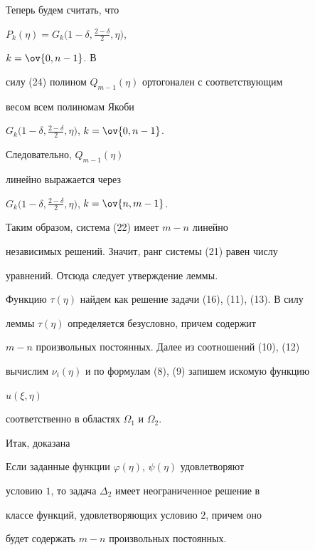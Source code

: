 Теперь будем считать, что 


$P_k(\eta)=G_k\big(1-\delta, \frac{2-\delta}{2},\eta\big)$, 


$k=\ov{0,n-1}$. В 


силу (24) полином $Q_{m-1}(\eta)$ ортогонален с соответствующим 


весом всем полиномам Якоби 


$G_k\big(1-\delta, \frac{2-\delta}{2},\eta\big)$, $k=\ov{0,n-1}$. 


Следовательно, $Q_{m-1}(\eta)$ 


линейно выражается через 


$G_k\big(1-\delta, \frac{2-\delta}{2},\eta\big)$, $k=\ov{n,m-1}$. 


Таким образом, система (22) имеет $m-n$ линейно 


независимых решений. Значит, ранг системы (21) равен числу 


уравнений. Отсюда следует утверждение леммы. 


\medskip 


 


Функцию $\tau(\eta)$ найдем как решение задачи (16), (11), (13). В силу 


леммы $\tau(\eta)$ определяется безусловно, причем содержит 


$m-n$ произвольных постоянных. Далее из соотношений (10), (12) 


вычислим $\nu_i(\eta)$ и по формулам (8), (9) запишем искомую функцию 


$u(\xi,\eta)$ 


соответственно в областях $\Omega_1$ и $\Omega_2$. 


 


Итак, доказана 


 


\begin{thmnonum} 


Если заданные функции $\varphi(\eta)$, $\psi(\eta)$ удовлетворяют 


условию $1$, то задача $\Delta_2$ имеет неограниченное решение в 


классе функций, удовлетворяющих условию $2$, причем оно 


будет содержать $m-n$ произвольных постоянных. 


\end{thmnonum} 


